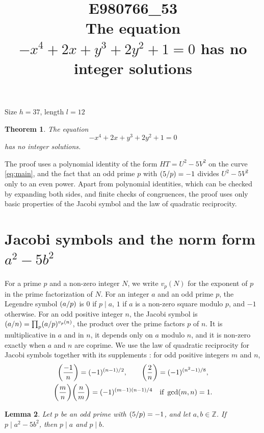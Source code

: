 \documentclass[11pt]{article}
\title{\textbf{E980766\_53}\\[4pt] {\Large The equation $-x^{4}+2x+y^{3}+2y^{2}+1=0$ has no integer solutions}}
\author{}
\date{}
\newtheorem{theorem}{Theorem}
\newtheorem{lemma}[theorem]{Lemma}
\newcommand{\Z}{\mathbb{Z}}
\newcommand{\leg}[2]{\mathchoice{\biggl(\dfrac{#1}{#2}\biggr)}{(#1/#2)}{(#1/#2)}{(#1/#2)}}
\begin{document}
\maketitle
\vspace{-8ex}
\begin{center}
Size $h=37$, length $l=12$
\end{center}

\begin{theorem}\label{thm:main}
The equation
\begin{equation}\label{eq:main}
-x^{4}+2x+y^{3}+2y^{2}+1=0
\end{equation}
has no integer solutions.
\end{theorem}

The proof uses a polynomial identity of the form $HT=U^2-5V^2$ on the curve \eqref{eq:main}, and the fact that an odd prime $p$ with $\leg{5}{p}=-1$ divides $U^2-5V^2$ only to an even power. Apart from polynomial identities, which can be checked by expanding both sides, and finite checks of congruences, the proof uses only basic properties of the Jacobi symbol and the law of quadratic reciprocity.

\section{\texorpdfstring{Jacobi symbols and the norm form $a^2-5b^2$}{Jacobi symbols and the norm form}}

For a prime $p$ and a non-zero integer $N$, we write $v_p(N)$ for the exponent of $p$ in the prime factorization of $N$. For an integer $a$ and an odd prime $p$, the Legendre symbol $\leg{a}{p}$ is $0$ if $p\mid a$, $1$ if $a$ is a non-zero square modulo $p$, and $-1$ otherwise. For an odd positive integer $n$, the Jacobi symbol is $\leg{a}{n}=\prod_p\leg{a}{p}^{v_p(n)}$, the product over the prime factors $p$ of $n$. It is multiplicative in $a$ and in $n$, it depends only on $a$ modulo $n$, and it is non-zero exactly when $a$ and $n$ are coprime. We use the law of quadratic reciprocity for Jacobi symbols together with its supplements \cite[Chapter~5, \S2]{IR}: for odd positive integers $m$ and $n$,
\begin{gather*}
\leg{-1}{n}=(-1)^{(n-1)/2},\qquad\leg{2}{n}=(-1)^{(n^2-1)/8},\\
\leg{m}{n}\leg{n}{m}=(-1)^{(m-1)(n-1)/4}\quad\text{if }\gcd(m,n)=1.
\end{gather*}

\begin{lemma}\label{lem:divides}
Let $p$ be an odd prime with $\leg{5}{p}=-1$, and let $a,b\in\Z$. If $p\mid a^2-5b^2$, then $p\mid a$ and $p\mid b$.
\end{lemma}
\end{document}
